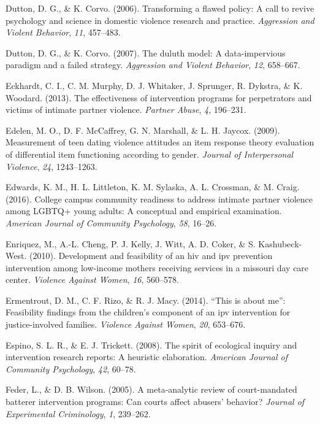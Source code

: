 \documentclass[11pt,]{tufte-book}
\begin{document}
\hypertarget{ref-dutton2006transforming}{}
Dutton, D. G., \& K. Corvo. (2006). Transforming a flawed policy: A call
to revive psychology and science in domestic violence research and
practice. \emph{Aggression and Violent Behavior}, \emph{11}, 457--483.

\hypertarget{ref-dutton2007duluth}{}
Dutton, D. G., \& K. Corvo. (2007). The duluth model: A data-impervious
paradigm and a failed strategy. \emph{Aggression and Violent Behavior},
\emph{12}, 658--667.

\hypertarget{ref-eckhardt2013effectiveness}{}
Eckhardt, C. I., C. M. Murphy, D. J. Whitaker, J. Sprunger, R. Dykstra,
\& K. Woodard. (2013). The effectiveness of intervention programs for
perpetrators and victims of intimate partner violence. \emph{Partner
Abuse}, \emph{4}, 196--231.

\hypertarget{ref-edelen2009measurement}{}
Edelen, M. O., D. F. McCaffrey, G. N. Marshall, \& L. H. Jaycox. (2009).
Measurement of teen dating violence attitudes an item response theory
evaluation of differential item functioning according to gender.
\emph{Journal of Interpersonal Violence}, \emph{24}, 1243--1263.

\hypertarget{ref-edwards2016college}{}
Edwards, K. M., H. L. Littleton, K. M. Sylaska, A. L. Crossman, \& M.
Craig. (2016). College campus community readiness to address intimate
partner violence among LGBTQ+ young adults: A conceptual and empirical
examination. \emph{American Journal of Community Psychology}, \emph{58},
16--26.

\hypertarget{ref-enriquez2010development}{}
Enriquez, M., A.-L. Cheng, P. J. Kelly, J. Witt, A. D. Coker, \& S.
Kashubeck-West. (2010). Development and feasibility of an hiv and ipv
prevention intervention among low-income mothers receiving services in a
missouri day care center. \emph{Violence Against Women}, \emph{16},
560--578.

\hypertarget{ref-ermentrout2014this}{}
Ermentrout, D. M., C. F. Rizo, \& R. J. Macy. (2014). ``This is about
me'': Feasibility findings from the children's component of an ipv
intervention for justice-involved families. \emph{Violence Against
Women}, \emph{20}, 653--676.

\hypertarget{ref-espino2008spirit}{}
Espino, S. L. R., \& E. J. Trickett. (2008). The spirit of ecological
inquiry and intervention research reports: A heuristic elaboration.
\emph{American Journal of Community Psychology}, \emph{42}, 60--78.

\hypertarget{ref-feder2005meta}{}
Feder, L., \& D. B. Wilson. (2005). A meta-analytic review of
court-mandated batterer intervention programs: Can courts affect
abusers' behavior? \emph{Journal of Experimental Criminology}, \emph{1},
239--262.
\end{document}

